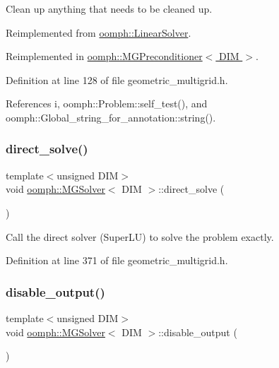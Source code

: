 Clean up anything that needs to be cleaned up. 



Reimplemented from \hyperlink{classoomph_1_1LinearSolver_a9d66f3262e80ca06a365f98216afd85f}{oomph\+::\+Linear\+Solver}.



Reimplemented in \hyperlink{classoomph_1_1MGPreconditioner_acc92bd3f8c9b729283d35c1f4ae37dd2}{oomph\+::\+M\+G\+Preconditioner$<$ D\+I\+M $>$}.



Definition at line 128 of file geometric\+\_\+multigrid.\+h.



References i, oomph\+::\+Problem\+::self\+\_\+test(), and oomph\+::\+Global\+\_\+string\+\_\+for\+\_\+annotation\+::string().

\mbox{\label{classoomph_1_1MGSolver_a966b9775086c2a238c212605a9bb16de}} 
\subsubsection{\texorpdfstring{direct\+\_\+solve()}{direct\_solve()}}
{\footnotesize\ttfamily template$<$unsigned D\+IM$>$ \\
void \hyperlink{classoomph_1_1MGSolver}{oomph\+::\+M\+G\+Solver}$<$ D\+IM $>$\+::direct\+\_\+solve (\begin{DoxyParamCaption}{ }\end{DoxyParamCaption})\hspace{0.3cm}{\ttfamily [inline]}}



Call the direct solver (Super\+LU) to solve the problem exactly. 



Definition at line 371 of file geometric\+\_\+multigrid.\+h.

\mbox{\label{classoomph_1_1MGSolver_a72dcbb3e6fd8420e7236ada2b5e33b91}} 
\subsubsection{\texorpdfstring{disable\+\_\+output()}{disable\_output()}}
{\footnotesize\ttfamily template$<$unsigned D\+IM$>$ \\
void \hyperlink{classoomph_1_1MGSolver}{oomph\+::\+M\+G\+Solver}$<$ D\+IM $>$\+::disable\+\_\+output (\begin{DoxyParamCaption}{ }\end{DoxyParamCaption})\hspace{0.3cm}{\ttfamily [inline]}}



